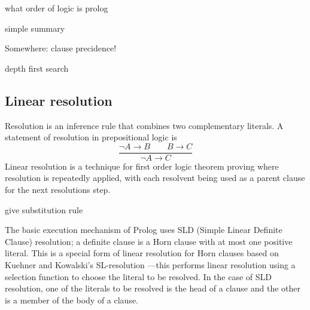 \documentclass[12pt,a4paper]{report}
\begin{document}
{\color{red} what order of logic is prolog}

{\color{red}
simple summary

Somewhere: clause precidence!


depth first search}

\subsection{Linear resolution}





Resolution is an inference rule that combines two complementary literals. A statement of resolution in {\color{red} prepositional} logic is 
\begin{equation}
\frac{\neg A \rightarrow B \qquad B \rightarrow C}{\neg A \rightarrow C}
\label{resolution}
\end{equation}
Linear resolution is a technique for first order logic theorem proving where resolution is repeatedly applied, with each resolvent being used as a parent clause for the next resolutions step.

{\color{red} give substitution rule}





The basic execution mechanism of Prolog uses SLD (Simple Linear Definite Clause) resolution; a definite clause is a Horn clause with at most one positive literal. This is a special form of linear resolution for Horn clauses based on Kuehner and  Kowalski's SL-resolution \cite{Kowalski1971}---this performs linear resolution using a selection function to choose the literal to be resolved. In the case of SLD resolution, one of the literals to be resolved is the head of a clause and the other is a member of the body of a clause.
\end{document}
